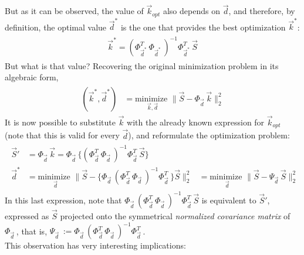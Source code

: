 \documentclass[11pt]{scrartcl} %
\begin{document}
But as it can be observed, the value of \(\vec{k}_{opt}\) also depends on \(\vec{d}\), and therefore, by definition, the optimal value \(\vec{d}^*\) is the one that provides the best optimization \(\vec{k}^*\):
\begin{align*}
    \begin{aligned}
      \vec{k}^* =  (\Phi_{\vec{d}^*\;}^T \Phi_{\vec{d}^*\;})^{-1} \Phi_{\vec{d}^*\;}^T\vec{S}
    \end{aligned}
\end{align*}
But what is that value? Recovering the original minimization problem in its algebraic form,
\begin{align*}
  \begin{aligned}
    (\vec{k}^*, \vec{d}^*) &= \underset{\vec{k}, \vec{d}}{\text{minimize }}
    \bigg\lVert \vec{S}-\Phi_{\vec{d}\;} \vec{k}\bigg\rVert_2^2
    \end{aligned}
\end{align*}
It is now possible to substitute \(\vec{k}\) with the already known expression for \(\vec{k}_{opt}\) (note that this is valid for every \(\vec{d}\)), and reformulate the optimization problem:
\begin{align*}
  \begin{aligned}
    \vec{S}'  &= \Phi_{\vec{d}\;} \vec{k}= \Phi_{\vec{d}\;} \Big\{(\Phi_{\vec{d}\;}^T \Phi_{\vec{d}\;})^{-1} \Phi_{\vec{d}\;}^T\vec{S} \Big\}\\[10pt]
    \vec{d}^* &= \underset{\vec{d}}{\text{minimize }}
    \bigg\lVert \vec{S}-\Big\{\Phi_{\vec{d}\;} (\Phi_{\vec{d}\;}^T \Phi_{\vec{d}\;})^{-1} \Phi_{\vec{d}\;}^T\Big\}\vec{S} \bigg\rVert_2^2 &= \underset{\vec{d}}{\text{minimize }}
    \bigg\lVert \vec{S}- \Psi_{\vec{d}\;} \vec{S} \bigg\rVert_2^2
    \end{aligned}
\end{align*}
In this last expression, note that \(\Phi_{\vec{d}\;} (\Phi_{\vec{d}\;}^T \Phi_{\vec{d}\;})^{-1} \Phi_{\vec{d}\;}^T\vec{S} \) is equivalent to \(\vec{S}'\), expressed as \(\vec{S}\) projected onto the symmetrical {\it normalized covariance matrix} of \(\Phi_{\vec{d}\;}\), that is, \(\Psi_{\vec{d}\;} := \Phi_{\vec{d}\;} (\Phi_{\vec{d}\;}^T \Phi_{\vec{d}\;})^{-1} \Phi_{\vec{d}\;}^T\).\\[7pt]
This observation has very interesting implications:
\end{document}
